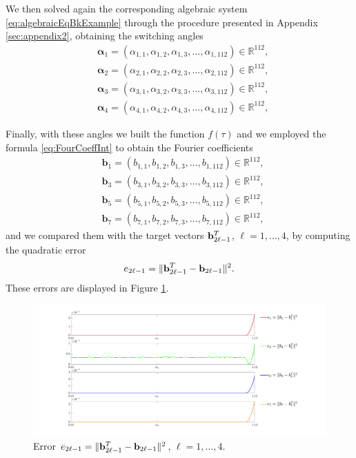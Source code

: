 \documentclass[a4paper]{article}
\numberwithin{equation}{section}
\begin{document}
We then solved again the corresponding algebraic system \eqref{eq:algebraicEqBkExample} through the procedure presented in Appendix \ref{sec:appendix2}, obtaining the switching angles
\begin{align*}
	&{\bm{\alpha}}_1 =(\alpha_{1,1},\alpha_{1,2},\alpha_{1,3},\ldots,\alpha_{1,112}) \in\mathbb{R}^{112},
	\\
	&{\bm{\alpha}}_2 =(\alpha_{2,1},\alpha_{2,2},\alpha_{2,3},\ldots,\alpha_{2,112}) \in\mathbb{R}^{112},
	\\
	&{\bm{\alpha}}_3 =(\alpha_{3,1},\alpha_{3,2},\alpha_{3,3},\ldots,\alpha_{3,112}) \in\mathbb{R}^{112},
	\\
	&{\bm{\alpha}}_4 =(\alpha_{4,1},\alpha_{4,2},\alpha_{4,3},\ldots,\alpha_{4,112}) \in\mathbb{R}^{112},
\end{align*}

Finally, with these angles we built the function $f(\tau)$ and we employed the formula \eqref{eq:FourCoeffInt} to obtain the Fourier coefficients 
\begin{align*}
	&{\bm{b}}_1 =(b_{1,1},b_{1,2},b_{1,3},\ldots,b_{1,112}) \in\mathbb{R}^{112},
	\\
	&{\bm{b}}_3 =(b_{3,1},b_{3,2},b_{3,3},\ldots,b_{3,112}) \in\mathbb{R}^{112},
	\\
	&{\bm{b}}_5 =(b_{5,1},b_{5,2},b_{5,3},\ldots,b_{5,112}) \in\mathbb{R}^{112},
	\\
	&{\bm{b}}_7 =(b_{7,1},b_{7,2},b_{7,3},\ldots,b_{7,112}) \in\mathbb{R}^{112},
\end{align*}
and we compared them with the target vectors ${\bf{b}}_{2\ell-1}^T$, $\ell=1,\ldots,4$, by computing the quadratic error
\begin{align*}
	e_{2\ell-1} = \|{\bf{b}}_{2\ell-1}^T-{\bf{b}}_{2\ell-1}\|^2.
\end{align*}
These errors are displayed in Figure \ref{fig:errorModulation}.

\begin{figure}[h]
	\centering
	\includegraphics[scale=0.3]{errorModulation}
	\caption{Error $e_{2\ell-1} = \|{\bf{b}}_{2\ell-1}^T-{\bf{b}}_{2\ell-1}\|^2$, $\ell = 1,\ldots,4$.}\label{fig:errorModulation}
\end{figure}
\end{document}
